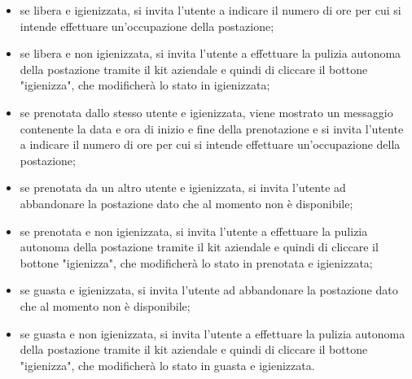 	\begin{itemize}
		\item se libera e igienizzata, si invita l'utente a indicare il numero di ore per cui si intende effettuare un'occupazione della postazione;
		\item se libera e non igienizzata, si invita l'utente a effettuare la pulizia autonoma della postazione tramite il kit aziendale e quindi di cliccare il bottone "igienizza", che modificherà lo stato in igienizzata;
		\item se prenotata dallo stesso utente e igienizzata, viene mostrato un messaggio contenente la data e ora di inizio e fine della prenotazione e si invita l'utente a indicare il numero di ore per cui si intende effettuare un'occupazione della postazione;
		\item se prenotata da un altro utente e igienizzata, si invita l'utente ad abbandonare la postazione dato che al momento non è disponibile;
		\item se prenotata e non igienizzata, si invita l'utente a effettuare la pulizia autonoma della postazione tramite il kit aziendale e quindi di cliccare il bottone "igienizza", che modificherà lo stato in prenotata e igienizzata;
		\item se guasta e igienizzata, si invita l'utente ad abbandonare la postazione dato che al momento non è disponibile;
		\item se guasta e non igienizzata, si invita l'utente a effettuare la pulizia autonoma della postazione tramite il kit aziendale e quindi di cliccare il bottone "igienizza", che modificherà lo stato in guasta e igienizzata.
	\end{itemize}
	
